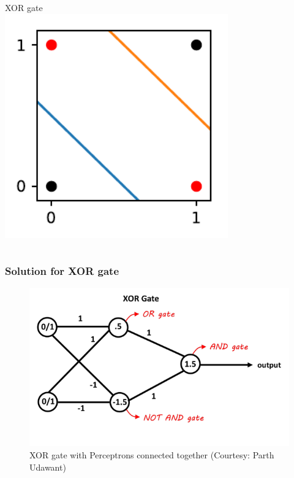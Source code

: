 \documentclass[aspectratio=169]{beamer}
\begin{document}
\begin{frame}
\begin{columns}[t]
		{\onslide<1-> \large XOR gate}
		\onslide<4->
		\includegraphics[width=1.0\textwidth]{imgs/xor.pdf}
	\end{columns}
\end{frame}

\begin{frame}
	\frametitle{Solution for XOR gate}
	\begin{center}
		\begin{figure}
			\includegraphics[width=0.7\linewidth,height=0.7\textheight,keepaspectratio]{imgs/xor_nn.png}
			\caption{XOR gate with Perceptrons connected together (Courtesy: Parth Udawant)}
		\end{figure}
	\end{center}
\end{frame}
\end{document}
